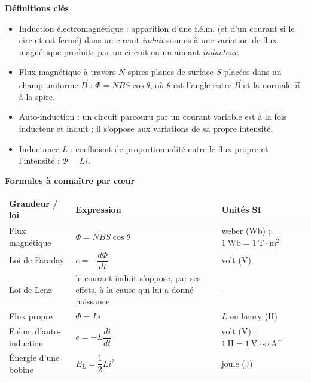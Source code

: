 \documentclass[11pt]{article}
\newcommand{\cle}[1]{{\popxbold\color{popdark}#1}}
\begin{document}
\begin{bilan}
\textbf{Définitions clés}
\begin{itemize}
  \item \cle{Induction électromagnétique} : apparition d'une f.é.m. (et d'un courant si le circuit est fermé) dans un circuit \emph{induit} soumis à une variation de flux magnétique produite par un circuit ou un aimant \emph{inducteur}.
  \item \cle{Flux magnétique} à travers $N$ spires planes de surface $S$ placées dans un champ uniforme $\vec{B}$ : $\Phi = NBS\cos\theta$, où $\theta$ est l'angle entre $\vec{B}$ et la normale $\vec{n}$ à la spire.
  \item \cle{Auto-induction} : un circuit parcouru par un courant variable est à la fois inducteur et induit ; il s'oppose aux variations de sa propre intensité.
  \item \cle{Inductance} $L$ : coefficient de proportionnalité entre le flux propre et l'intensité : $\Phi = Li$.
\end{itemize}

\textbf{Formules à connaître par cœur}
\begin{center}
\begin{tabularx}{\linewidth}{|l|X|l|}
\hline
\rowcolor{popblueL} \textbf{Grandeur / loi} & \textbf{Expression} & \textbf{Unités SI} \\
\hline
Flux magnétique & $\Phi = NBS\cos\theta$ & weber (Wb) ; $1~\text{Wb} = 1~\text{T}\cdot\text{m}^2$ \\
\hline
Loi de Faraday & $e = -\dfrac{d\Phi}{dt}$ & volt (V) \\
\hline
Loi de Lenz & le courant induit s'oppose, par ses effets, à la cause qui lui a donné naissance & --- \\
\hline
Flux propre & $\Phi = Li$ & $L$ en henry (H) \\
\hline
F.é.m. d'auto-induction & $e = -L\dfrac{di}{dt}$ & volt (V) ; $1~\text{H} = 1~\text{V}\cdot\text{s}\cdot\text{A}^{-1}$ \\
\hline
Énergie d'une bobine & $E_L = \dfrac{1}{2}Li^2$ & joule (J) \\
\hline
\end{tabularx}
\end{center}


\end{bilan}
\end{document}
